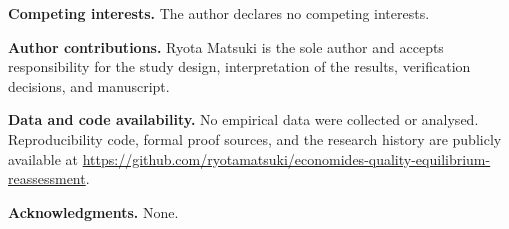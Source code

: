 \documentclass[11pt]{article}
\begin{document}
\noindent\textbf{Competing interests.} The author declares no competing interests.

\noindent\textbf{Author contributions.} Ryota Matsuki is the sole author and
accepts responsibility for the study design, interpretation of the
results, verification decisions, and manuscript.

\noindent\textbf{Data and code availability.} No empirical data were
collected or analysed. Reproducibility code, formal proof sources,
and the research history are publicly available at
\url{https://github.com/ryotamatsuki/economides-quality-equilibrium-reassessment}.

\noindent\textbf{Acknowledgments.} None.



\end{document}
